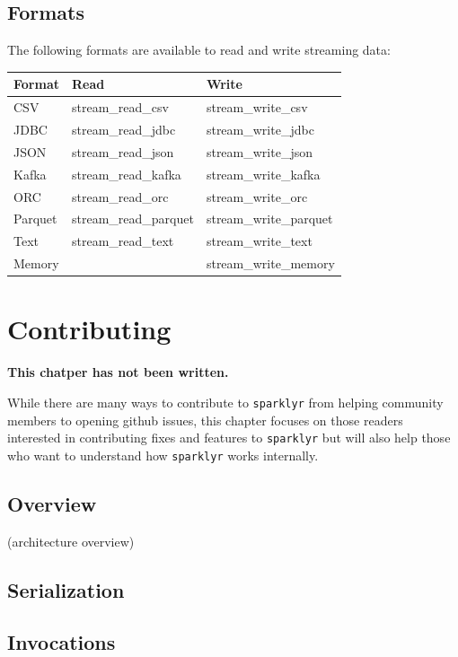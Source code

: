 \documentclass[]{book}
\theoremstyle{definition}
\theoremstyle{definition}
\theoremstyle{definition}
\theoremstyle{remark}
\begin{document}
\hypertarget{formats}{%
\section{Formats}\label{formats}}

The following formats are available to read and write streaming data:

\begin{longtable}[]{@{}lll@{}}
\toprule
Format & Read & Write\tabularnewline
\midrule
\endhead
CSV & stream\_read\_csv & stream\_write\_csv\tabularnewline
JDBC & stream\_read\_jdbc & stream\_write\_jdbc\tabularnewline
JSON & stream\_read\_json & stream\_write\_json\tabularnewline
Kafka & stream\_read\_kafka & stream\_write\_kafka\tabularnewline
ORC & stream\_read\_orc & stream\_write\_orc\tabularnewline
Parquet & stream\_read\_parquet & stream\_write\_parquet\tabularnewline
Text & stream\_read\_text & stream\_write\_text\tabularnewline
Memory & & stream\_write\_memory\tabularnewline
\bottomrule
\end{longtable}

\hypertarget{contributing}{%
\chapter{Contributing}\label{contributing}}

\textbf{This chatper has not been written.}

While there are many ways to contribute to \texttt{sparklyr} from
helping community members to opening github issues, this chapter focuses
on those readers interested in contributing fixes and features to
\texttt{sparklyr} but will also help those who want to understand how
\texttt{sparklyr} works internally.

\hypertarget{overview-5}{%
\section{Overview}\label{overview-5}}

(architecture overview)

\hypertarget{serialization}{%
\section{Serialization}\label{serialization}}

\hypertarget{invocations}{%
\section{Invocations}\label{invocations}}
\end{document}

